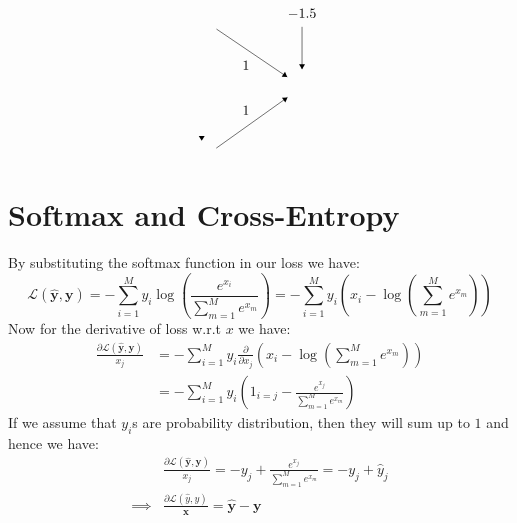 \documentclass[12]{article}
\newcommand{\myskip}{0.7em}
\begin{document}
\begin{enumerate}[label=\textbf{(\alph*)}]
\[\begin{tikzpicture}[scale=0.15]
			\fill [black] (42.9,-40.4) -- (43.4,-39.6) -- (42.4,-39.6);
			\draw [black] (45.39,-21.68) -- (57.31,-29.72);
			\fill [black] (57.31,-29.72) -- (56.93,-28.86) -- (56.37,-29.69);
			\draw (50.35,-26.2) node [below] {$1$};
			\draw [black] (45.35,-41.66) -- (57.35,-33.14);
			\fill [black] (57.35,-33.14) -- (56.41,-33.19) -- (56.99,-34.01);
			\draw (50.35,-36.9) node [above] {$1$};
			\draw [black] (59.8,-21.3) -- (59.8,-28.4);
			\draw (59.8,-20.8) node [above] {$-1.5$};
			\fill [black] (59.8,-28.4) -- (60.3,-27.6) -- (59.3,-27.6);
		\end{tikzpicture}
		\]
	\end{enumerate}
	
	\pagebreak
	\section{Softmax and Cross-Entropy}
	By substituting the softmax function in our loss we have:
	\[
	\mathcal{L}(\bm{\hat{y}}, \bm{y}) = - \sum_{i=1}^{M} y_i \log \left(\frac{e^{x_i}}{\sum_{m=1}^{M}e^{x_m}}\right) = - \sum_{i=1}^{M} y_i\left(x_i - \log\left(\sum_{m=1}^{M}e^{x_m}\right)\right)
	\]
	Now for the derivative of loss w.r.t $x$ we have:
	\[
	\begin{aligned}
		\frac{\partial \mathcal{L}(\bm{\hat{y}}, \bm{y})}{x_j} &= -\sum_{i=1}^{M} y_i \frac{\partial}{\partial x_j} \left(x_i - \log\left(\sum_{m=1}^{M}e^{x_m}\right)\right) \\[\myskip]
		&= -\sum_{i=1}^{M} y_i \left(1_{i=j} - \frac{e^{x_j}}{\sum_{m=1}^{M}e^{x_m}}\right)
	\end{aligned}
	\]
	If we assume that $y_i$s are probability distribution, then they will sum up to $1$ and hence we have:
	\[
	\begin{aligned}
		& \frac{\partial \mathcal{L}(\bm{\hat{y}}, \bm{y})}{x_j} = - y_j + \frac{e^{x_j}}{\sum_{m=1}^{M}e^{x_m}} = -y_j + \hat{y}_j \\[\myskip]
		\implies & \boxed{\frac{\partial \mathcal{L}(\hat{y}, y)}{\bm{x}} = \bm{\hat{y}} - \bm{y}}
	\end{aligned}
	\]
	
	\pagebreak
\end{document}

